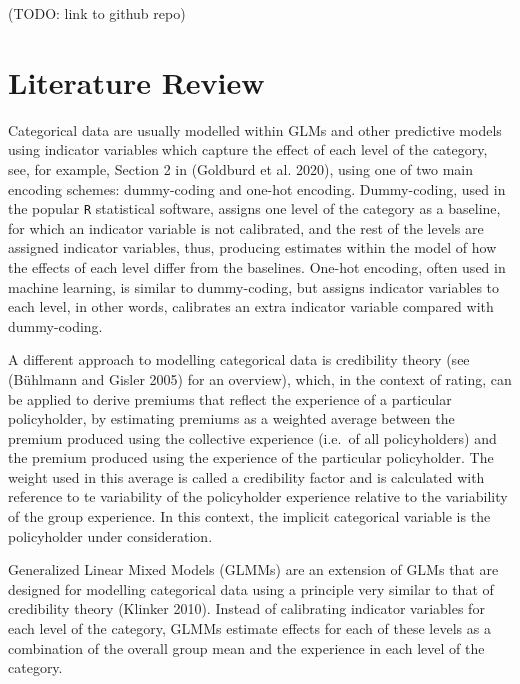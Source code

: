 \documentclass{article}
\begin{document}
(TODO: link to github repo)

\hypertarget{lit_review}{%
\section{Literature Review}\label{lit_review}}

Categorical data are usually modelled within GLMs and other predictive
models using indicator variables which capture the effect of each level
of the category, see, for example, Section 2 in (Goldburd et al. 2020),
using one of two main encoding schemes: dummy-coding and one-hot
encoding. Dummy-coding, used in the popular \texttt{R} statistical
software, assigns one level of the category as a baseline, for which an
indicator variable is not calibrated, and the rest of the levels are
assigned indicator variables, thus, producing estimates within the model
of how the effects of each level differ from the baselines. One-hot
encoding, often used in machine learning, is similar to dummy-coding,
but assigns indicator variables to each level, in other words,
calibrates an extra indicator variable compared with dummy-coding.

A different approach to modelling categorical data is credibility theory
(see (Bühlmann and Gisler 2005) for an overview), which, in the context
of rating, can be applied to derive premiums that reflect the experience
of a particular policyholder, by estimating premiums as a weighted
average between the premium produced using the collective experience
(i.e.~of all policyholders) and the premium produced using the
experience of the particular policyholder. The weight used in this
average is called a credibility factor and is calculated with reference
to te variability of the policyholder experience relative to the
variability of the group experience. In this context, the implicit
categorical variable is the policyholder under consideration.

Generalized Linear Mixed Models (GLMMs) are an extension of GLMs that
are designed for modelling categorical data using a principle very
similar to that of credibility theory (Klinker 2010). Instead of
calibrating indicator variables for each level of the category, GLMMs
estimate effects for each of these levels as a combination of the
overall group mean and the experience in each level of the category.
\end{document}
